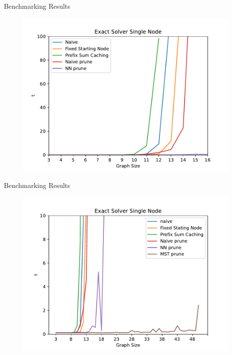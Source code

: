 \begin{frame}{Benchmarking Results}
  \vspace{-0.25cm}
  \begin{figure}
    \includegraphics[width=\linewidth,height=.9\textheight,keepaspectratio]{./assets/v4.pdf}
  \end{figure}
\end{frame}
\begin{frame}{Benchmarking Results}
  \vspace{-0.25cm}
  \begin{figure}
    \includegraphics[width=\linewidth,height=.9\textheight,keepaspectratio]{./assets/v5.pdf}
  \end{figure}
\end{frame}
